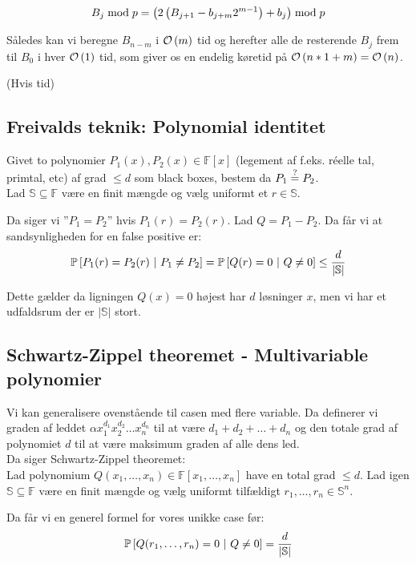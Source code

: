 $$
  B_{j} \bmod p
  = \left( 2 \left(  B_{j+1} - b_{j+m} 2^{m-1}  \right) + b_j \right) \bmod p
$$

Således kan vi beregne $B_{n-m}$ i $\mathcal{O} \left(  m  \right)$ tid og herefter alle de resterende $B_j$ frem til $B_0$ i hver $\mathcal{O} \left(  1  \right)$ tid, som giver os en endelig køretid på $\mathcal{O} \left(  n*1 + m  \right) = \mathcal{O} \left(  n  \right)$.









\newpage
(Hvis tid)
\subsection{Freivalds teknik: Polynomial identitet}
Givet to polynomier $P_1(x), P_2(x) \in \mathbb F[x]$ (legement af f.eks. réelle tal, primtal, etc) af grad $\leq d$ som black boxes, bestem da $P_1 \stackrel{?}{=} P_2$.\\

Lad $\mathbb S \subseteq \mathbb F$ være en finit mængde og vælg uniformt et $r \in \mathbb S$.

Da siger vi ''$P_1 = P_2$'' hvis $P_1(r) = P_2(r)$. Lad $Q = P_1 - P_2$. Da får vi at sandsynligheden for en false positive er:
$$
  \P{P_1(r) = P_2(r) \ | P_1 \neq P_2} = \P{Q(r) = 0 \ | Q \neq 0} \leq \frac{d}{|\mathbb S|}
$$

Dette gælder da ligningen $Q(x) = 0$ højest har $d$ løsninger $x$, men vi har et udfaldsrum der er $|\mathbb{S}|$ stort.

\subsection{Schwartz-Zippel theoremet - Multivariable polynomier}
Vi kan generalisere ovenstående til casen med flere variable. Da definerer vi graden af leddet $\alpha x_1^{d_1} x_2^{d_2} \dots x_n^{d_n}$ til at være $d_1 + d_2 + \dots + d_n$ og den totale grad af polynomiet $d$ til at være maksimum graden af alle dens led.\\

Da siger Schwartz-Zippel theoremet:\\
Lad polynomium $Q(x_1, \dots, x_n) \in \mathbb F[x_1, \dots, x_n]$ have en total grad $\leq d$. Lad igen $\mathbb S \subseteq \mathbb F$ være en finit mængde og vælg uniformt tilfældigt $r_1, \dots, r_n \in \mathbb S^n$.

Da får vi en generel formel for vores unikke case før:
$$
  \P{Q(r_1, \dots, r_n) = 0 \ | Q \neq 0} = \frac{d}{|\mathbb S|}
$$


